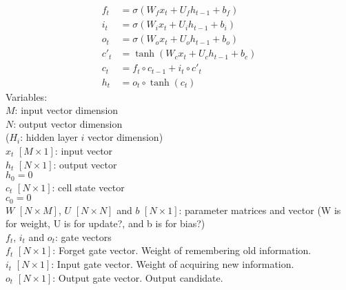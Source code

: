 \documentclass[letterpaper]{article}
\begin{document}
\begin{equation}
\begin{aligned}
f_{t}&=\sigma(W_{f}x_{t}+U_{f}h_{t-1}+b_{f})\\
i_{t}&=\sigma(W_{i}x_{t}+U_{i}h_{t-1}+b_{i})\\
o_{t}&=\sigma(W_{o}x_{t}+U_{o}h_{t-1}+b_{o})\\
c'_{t}&=\tanh(W_{c}x_{t}+U_{c}h_{t-1}+b_{c})\\
c_{t}&=f_{t}\circ c_{t-1}+i_{t}\circ c'_t\\
h_{t}&=o_{t}\circ \tanh(c_{t})
\end{aligned}
\end{equation}
Variables:\\
$M$: input vector dimension\\
$N$: output vector dimension\\
($H_i$: hidden layer $i$ vector dimension)\\
$x_{t}$ $[M\times 1]$: input vector\\
$h_{t}$ $[N\times 1]$: output vector\\
$h_{0} = 0$\\
$c_{t}$ $[N\times 1]$: cell state vector\\
$c_{0} = 0$\\
$W$ $[N\times M]$, $U$ $[N\times N]$ and $b$ $[N\times 1]$: parameter matrices and vector (W is for weight, U is for update?, and b is for bias?)\\
$f_{t}$, $i_{t}$ and $o_{t}$: gate vectors\\
$f_{t}$ $[N\times 1]$: Forget gate vector. Weight of remembering old information.\\
$i_{t}$ $[N\times 1]$: Input gate vector. Weight of acquiring new information.\\
$o_{t}$ $[N\times 1]$: Output gate vector. Output candidate.
\end{document}
